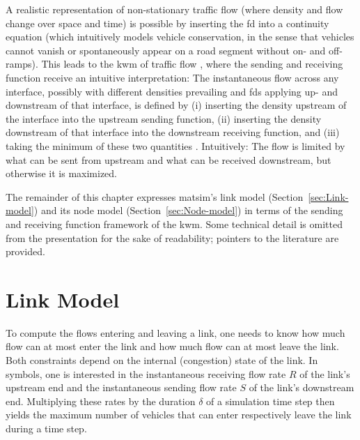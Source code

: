 A realistic representation of non-stationary traffic flow (where density
and flow change over space and time) is possible by inserting the
\gls{fd} into a continuity equation (which intuitively models vehicle conservation,
in the sense that vehicles cannot vanish or spontaneously appear on
a road segment without on- and off-ramps). This leads to the \gls{kwm} 
of traffic flow \citep[][]{lighthill-1955,richards-1956},
where the sending and receiving function receive an intuitive interpretation:
The instantaneous flow across any interface, possibly with different
densities prevailing and \glspl{fd} applying up- and downstream of that interface,
is defined by (i) inserting the density upstream of the interface
into the upstream sending function, (ii) inserting the density downstream
of that interface into the downstream receiving function, and (iii)
taking the minimum of these two quantities \citep{daganzo-1994,lebacque-1996}.
Intuitively: The flow is limited by what can be sent from upstream
and what can be received downstream, but otherwise it is maximized.

The remainder of this chapter expresses \gls{matsim}\textquoteright{}s link
model (Section~\ref{sec:Link-model}) and its node model (Section~\ref{sec:Node-model})
in terms of the sending and receiving function framework of the \gls{kwm}.
Some technical detail is omitted from the presentation for the sake
of readability; pointers to the literature are provided.

\section{\label{sec:Link-model}Link Model}
To compute the flows entering and leaving a link, one needs to know
how much flow can at most enter the link and how much flow can at
most leave the link. Both constraints depend on the internal (congestion)
state of the link. In symbols, one is interested in the instantaneous
receiving flow rate $R$ of the link's upstream end and the instantaneous
sending flow rate $S$ of the link's downstream end. Multiplying these
rates by the duration $\delta$ of a simulation time step then yields
the maximum number of vehicles that can enter respectively leave the link
during a time step.


